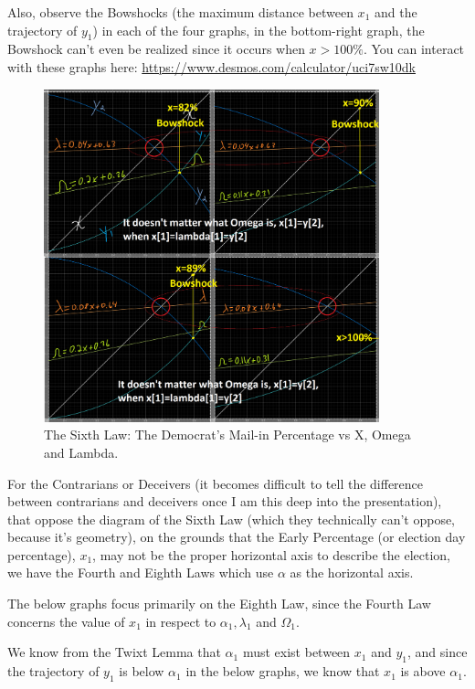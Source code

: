 Also, observe the Bowshocks (the maximum distance between $x_{1}$ and the trajectory of $y_{1}$) in each of the four graphs, in the bottom-right graph, the Bowshock can't even be realized since it occurs when $x>100\%$. You can interact with these graphs here: \url{https://www.desmos.com/calculator/uci7sw10dk}
\begin{figure}[bp!]
\begin{center}
\caption{The Sixth Law: The Democrat's Mail-in Percentage vs X, Omega and Lambda.}
\includegraphics[width=275pt]{Sixth Law, x,lambda,omega.png}
\end{center}
\end{figure}
\newpage
For the Contrarians or Deceivers (it becomes difficult to tell the difference between contrarians and deceivers once I am this deep into the presentation), that oppose the diagram of the Sixth Law (which they technically can't oppose, because it's geometry), on the grounds that the Early Percentage (or election day percentage), $x_{1}$, may not be the proper horizontal axis to describe the election, we have the Fourth and Eighth Laws which use $\alpha$ as the horizontal axis.

The below graphs focus primarily on the Eighth Law, since the Fourth Law concerns the value of $x_{1}$ in respect to $\alpha_{1}, \lambda_{1}$ and $\Omega_{1}$. 

We know from the Twixt Lemma that $\alpha_{1}$ must exist between $x_{1}$ and $y_{1}$, and since the trajectory of $y_{1}$ is below $\alpha_{1}$ in the below graphs, we know that $x_{1}$ is above $\alpha_{1}$.

